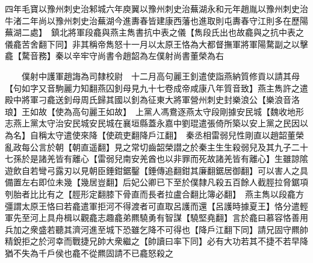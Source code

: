 四年毛寶以豫州刺史治邾城六年庾翼以豫州刺史治蕪湖永和元年趙胤以豫州刺史治牛渚二年尚以豫州刺史治蕪湖今進夀春皆建康西藩也進取則屯夀春守江則多在歷陽蕪湖二處】　鎮北將軍段龕與燕主雋書抗中表之儀【雋段氏出也故龕與之抗中表之儀龕苦舍翻下同】非其稱帝雋怒十一月以太原王恪為大都督撫軍將軍陽騖副之以擊龕【騖音務】秦以辛牢守尚書令趙韶為左僕射尚書董榮為右

　　僕射中護軍趙誨為司隸校尉　十二月高句麗王釗遣使詣燕納質修貢以請其母【句如字又音駒麗力知翻燕囚釗母見九十七卷成帝咸康八年質音致】燕主雋許之遣殿中將軍刁龕送釗母周氏歸其國以釗為征東大將軍營州刺史封樂浪公【樂浪音洛琅】王如故【使為高句麗王如故】　上黨人馮鴦逐燕太守段剛據安民城【魏收地形志燕上黨太守治安民城安民城在襄垣縣蓋永嘉中劉琨遣張倚所築以安上黨之民因以為名】自稱太守遣使來降【使疏吏翻降戶江翻】　秦丞相雷弱兒性剛直以趙韶董榮亂政每公言於朝【朝直遥翻】見之常切齒韶榮譛之於秦主生生殺弱兒及其九子二十七孫於是諸羌皆有離心【雷弱兒南安羌酋也以非罪而死故諸羌皆有離心】生雖諒隂遊飲自若彎弓露刃以見朝臣錘鉗鋸鑿【錘傳追翻鉗其廉翻鋸居御翻】可以害人之具備置左右即位未幾【幾居豈翻】后妃公卿已下至於僕隸凡殺五百餘人截脛拉脅鋸項刳胎者比比有之【脛形定翻膝下骨直而長者拉盧合翻比簿必翻】　燕主雋以段龕方彊謂太原王恪曰若龕遣軍拒河不得渡者可直取呂護而還【呂護時據夏王】恪分遣輕軍先至河上具舟楫以觀龕志趣龕弟羆驍勇有智謀【驍堅堯翻】言於龕曰慕容恪善用兵加之衆盛若聽其濟河進至城下恐雖乞降不可得也【降戶江翻下同】請兄固守羆帥精銳拒之於河幸而戰捷兄帥大衆繼之【帥讀曰率下同】必有大功若其不捷不若早降猶不失為千戶侯也龕不從羆固請不已龕怒殺之

